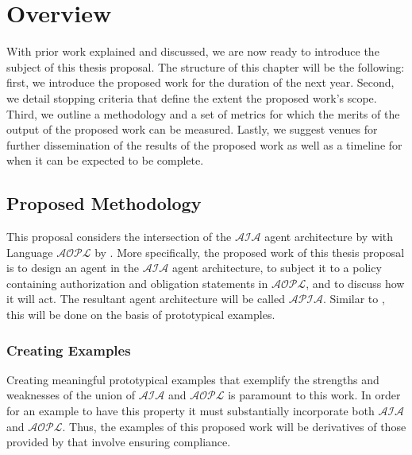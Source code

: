\chapter{Overview}


With prior work explained and discussed, we are now ready to introduce the subject of this thesis proposal.
The structure of this chapter will be the following: first, we introduce the proposed work for the duration of the next year.
Second, we detail stopping criteria that define the extent the proposed work's scope.
Third, we outline a methodology and a set of metrics for which the merits of the output of the proposed work can be measured.
Lastly, we suggest venues for further dissemination of the results of the proposed work as well as a timeline for when it can be expected to be complete.

\section{Proposed Methodology}

This proposal considers the intersection of the $\mathcal{AIA}$ agent architecture by \citet{blount_towards_2014} with Language $\mathcal{AOPL}$ by \citet{gelfond_authorization_2008}.
More specifically, the proposed work of this thesis proposal is to design an agent in the $\mathcal{AIA}$ agent architecture, to subject it to a policy containing authorization and obligation statements in $\mathcal{AOPL}$, and to discuss how it will act.
The resultant agent architecture will be called $\mathcal{APIA}$.
Similar to \citet{blount_towards_2014}, this will be done on the basis of prototypical examples.

\subsection{Creating Examples}

Creating meaningful prototypical examples that exemplify the strengths and weaknesses of the union of $\mathcal{AIA}$ and $\mathcal{AOPL}$ is paramount to this work.
In order for an example to have this property it must substantially incorporate both $\mathcal{AIA}$ and $\mathcal{AOPL}$.
Thus, the examples of this proposed work will be derivatives of those provided by \citet{blount_towards_2014} that involve ensuring compliance.

